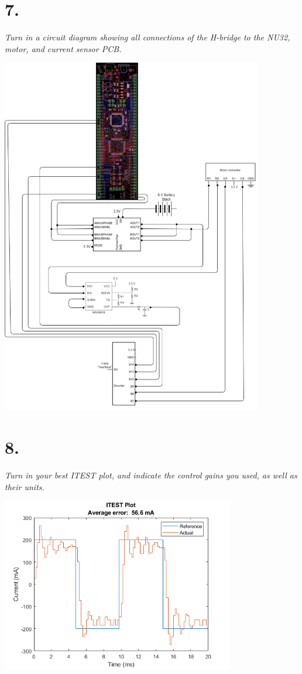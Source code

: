 \documentclass[12pt]{article}
\begin{document}
\section*{7.}
\textit{Turn in a circuit diagram showing all connections of the H-bridge to the NU32, motor, and current sensor PCB.}

\begin{center}
    \includegraphics[width=4.5in]{circuit_full.png}
\end{center}

\section*{8.}
\textit{Turn in your best ITEST plot, and indicate the control gains you used, as well as their units.}

\begin{center}
    \includegraphics[width=4in]{ITEST_kp0.5_ki5.png}
\end{center}
\end{document}
